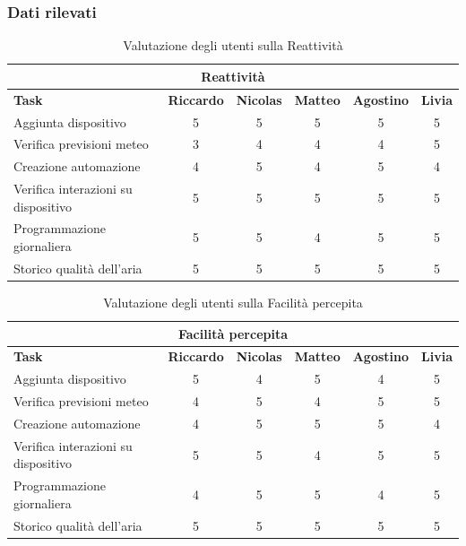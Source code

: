 \documentclass[a4paper,12pt]{article}
\begin{document}
\subsubsection{Dati rilevati}
\begin{table}[h!]
\centering
\begin{tabular}{|l|c|c|c|c|c|}
\hline
\multicolumn{6}{|c|}{\textbf{Reattività}} \\ \hline
\textbf{Task} & \textbf{Riccardo} & \textbf{Nicolas} & \textbf{Matteo} & \textbf{Agostino} & \textbf{Livia} \\ \hline
Aggiunta dispositivo & 5 & 5 & 5 & 5 & 5 \\ \hline
Verifica previsioni meteo & 3 & 4 & 4 & 4 & 5 \\ \hline
Creazione automazione & 4 & 5 & 4 & 5 & 4 \\ \hline
Verifica interazioni su dispositivo & 5 & 5 & 5 & 5 & 5 \\ \hline
Programmazione giornaliera & 5 & 5 & 4 & 5 & 5 \\ \hline
Storico qualità dell'aria & 5 & 5 & 5 & 5 & 5 \\ \hline
\end{tabular}
\caption{Valutazione degli utenti sulla Reattività}
\end{table}

\begin{table}[h!]
\centering
\begin{tabular}{|l|c|c|c|c|c|}
\hline
\multicolumn{6}{|c|}{\textbf{Facilità percepita}} \\ \hline
\textbf{Task} & \textbf{Riccardo} & \textbf{Nicolas} & \textbf{Matteo} & \textbf{Agostino} & \textbf{Livia} \\ \hline
Aggiunta dispositivo & 5 & 4 & 5 & 4 & 5 \\ \hline
Verifica previsioni meteo & 4 & 5 & 4 & 5 & 5 \\ \hline
Creazione automazione & 4 & 5 & 5 & 5 & 4 \\ \hline
Verifica interazioni su dispositivo & 5 & 5 & 4 & 5 & 5 \\ \hline
Programmazione giornaliera & 4 & 5 & 5 & 4 & 5 \\ \hline
Storico qualità dell'aria & 5 & 5 & 5 & 5 & 5 \\ \hline
\end{tabular}
\caption{Valutazione degli utenti sulla Facilità percepita}
\end{table}
\end{document}

